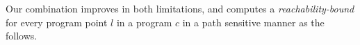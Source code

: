 Our combination improves in both limitations, and computes 
a \emph{reachability-bound} for every program point $l$ in a program $c$ in a path sensitive manner as the follows.




